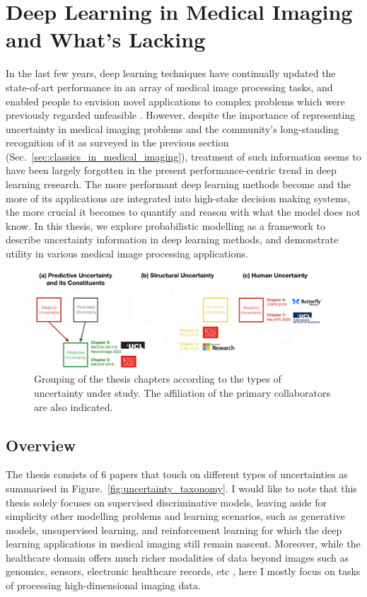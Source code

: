\section{Deep Learning in Medical Imaging and What's Lacking} 
In the last few years, deep learning techniques have continually updated the state-of-art performance in an array of medical image processing tasks, and enabled people to envision novel applications to complex problems which were previously regarded unfeasible \cite{shen2017deep,litjens2017survey}. However, despite the importance of representing uncertainty in medical imaging problems and the community's long-standing recognition of it as surveyed in the previous section (Sec.~\ref{sec:classics_in_medical_imaging}), treatment of such information seems to have been largely forgotten in the present performance-centric trend in deep learning research. The more performant deep learning methods become and the more of its applications are integrated into high-stake decision making systems, the more crucial it becomes to quantify and reason with what the model does not know. In this thesis, we explore probabilistic modelling as a framework to describe uncertainty information in deep learning methods, and demonstrate utility in various medical image processing applications. 

\begin{figure}[ht]
	\includegraphics[width=\linewidth]{chapter_1/thesis_structure_03.png}
	\centering	
	\vspace{-2mm}
	\caption{\small Grouping of the thesis chapters according to the types of uncertainty under study. The affiliation of the primary collaborators are also indicated. } 
	\label{fig:thesis_structure}
\end{figure}

\subsection*{Overview}

The thesis consists of 6 papers that touch on different types of uncertainties as summarised in Figure.~\ref{fig:uncertainty_taxonomy}. I would like to note that this thesis solely focuses on supervised discriminative models, leaving aside for simplicity other modelling problems and learning scenarios, such as generative models, unsupervised learning, and reinforcement learning for which the deep learning applications in medical imaging still remain nascent. Moreover, while the healthcare domain offers much richer modalities of data beyond images such as genomics, sensors, electronic healthcare records, etc \cite{esteva2019guide}, here I mostly focus on tasks of processing high-dimensional imaging data. 

